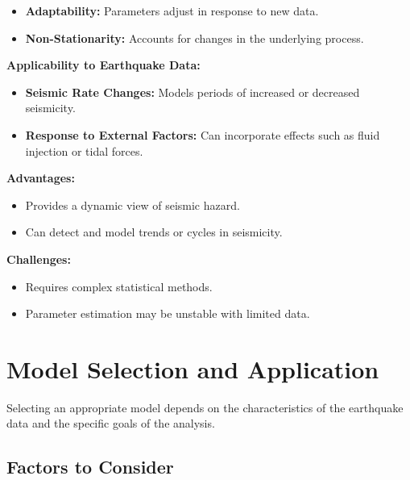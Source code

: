 \documentclass{article}
\begin{document}
\begin{itemize}
    \item \textbf{Adaptability:} Parameters adjust in response to new data.
    \item \textbf{Non-Stationarity:} Accounts for changes in the underlying process.
\end{itemize}

\textbf{Applicability to Earthquake Data:}

\begin{itemize}
    \item \textbf{Seismic Rate Changes:} Models periods of increased or decreased seismicity.
    \item \textbf{Response to External Factors:} Can incorporate effects such as fluid injection or tidal forces.
\end{itemize}

\textbf{Advantages:}

\begin{itemize}
    \item Provides a dynamic view of seismic hazard.
    \item Can detect and model trends or cycles in seismicity.
\end{itemize}

\textbf{Challenges:}

\begin{itemize}
    \item Requires complex statistical methods.
    \item Parameter estimation may be unstable with limited data.
\end{itemize}

\section{Model Selection and Application}

Selecting an appropriate model depends on the characteristics of the earthquake data and the specific goals of the analysis.

\subsection{Factors to Consider}
\end{document}
